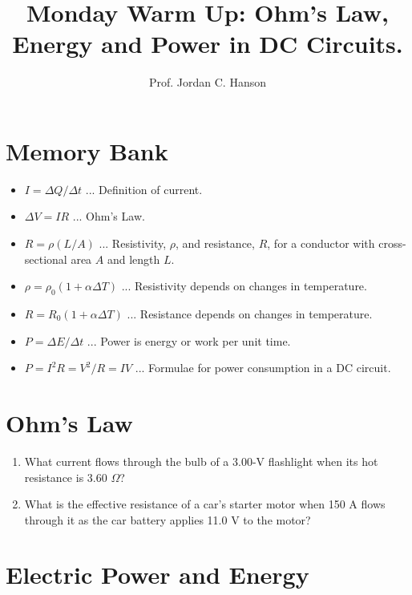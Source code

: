 \documentclass{article}
\begin{document}
\twocolumn

\title{Monday Warm Up: Ohm's Law, Energy and Power in DC Circuits.}
\author{Prof. Jordan C. Hanson}

\maketitle

\section{Memory Bank}

\begin{itemize}
\item $I = \Delta Q / \Delta t$ ... Definition of current.
\item $\Delta V = I R$ ... Ohm's Law.
\item $R = \rho (L/A)$ ... Resistivity, $\rho$, and resistance, $R$, for a conductor with cross-sectional area $A$ and length $L$.
\item $\rho = \rho_0(1+\alpha \Delta T)$ ... Resistivity depends on changes in temperature.
\item $R = R_0(1+\alpha \Delta T)$ ... Resistance depends on changes in temperature.
\item $P = \Delta E/\Delta t$ ... Power is energy or work per unit time.
\item $P = I^2 R = V^2/R = IV$ ... Formulae for power consumption in a DC circuit.
\end{itemize}

\section{Ohm's Law}

\begin{enumerate}
\item What current flows through the bulb of a 3.00-V flashlight when its hot resistance is 3.60 $\Omega$? \\ \vspace{1.5cm}
\item What is the effective resistance of a car’s starter motor when 150 A flows through it as the car battery applies 11.0 V to the motor? \\ \vspace{1.5cm}
\end{enumerate}

\section{Electric Power and Energy}
\end{document}
